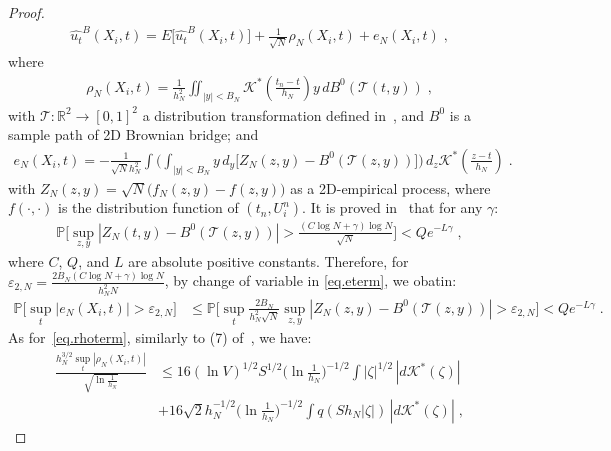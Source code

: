 \documentclass[a4paper,11pt]{article}
\theoremstyle{definition}
\begin{document}
\begin{proof}
\begin{align*}
\widehat{u_t}^B(X_i,t)=E	\Big[\widehat{u_t}^B(X_i,t)\Big]+\frac{1}{\sqrt{N}}\rho_N(X_i,t)+e_N(X_i,t)\;,
\end{align*}
where
\begin{align}
\rho_N(X_i,t)=\frac{1}{h_N^2}\iint_{|y|<B_N}	\mathcal{K}^*(\frac{t_n-t}{h_N})y\,dB^0(\mathcal{T}(t,y))\;,\label{eq.rhoterm}
\end{align}
with $\mathcal{T}:\mathbb{R}^2\to [0,1]^2$ a distribution transformation defined in~\cite{rosenblatt1952remarks}, and $B^0$ is a sample path of 2D Brownian bridge; and
\begin{align}
e_N(X_i,t)=-\frac{1}{\sqrt{N}h_N^2}\int\Big(\int_{|y|<B_N}y\,d_y\big[Z_N(z,y)-B^0(\mathcal{T}(z,y))\big]\Big)\,d_z \mathcal{K}^*(\frac{z-t}{h_N})\;.	\label{eq.eterm}
\end{align}
with $Z_N(z,y) = \sqrt{N}\big(f_N(z,y)-f(z,y)\big)$ as a 2D-empirical process, where $f(\cdot,\cdot)$ is the distribution function of $(t_n,U_i^n)$. It is proved in~\cite{tusnady1977remark} that for any $\gamma$:
\begin{align*}
\mathbb{P}\Big[\sup_{z,y}|Z_N(t,y)-B^0(\mathcal{T}(z,y))|>\frac{(C\log N+\gamma)\log N}{\sqrt{N}}\Big]<Qe^{-L \gamma}\;,
\end{align*}
where $C$, $Q$, and $L$ are absolute positive constants. Therefore, for  $\varepsilon_{2,N}=\frac{2B_N(C\log N+\gamma)\log N}{h_N^2N}$, by change of variable in \eqref{eq.eterm}, we obatin:
\begin{align*}
	\mathbb{P}\Big[\sup_{t}|e_N(X_i,t)|>\varepsilon_{2,N}\Big]&\leq\mathbb{P}\Big[\sup_{t}\frac{2B_N}{h^2_N\sqrt{N}}\sup_{z,y}|Z_N(z,y)-B^0(\mathcal{T}(z,y))|>\varepsilon_{2,N}\Big]<Qe^{-L\gamma}\;.
\end{align*}
As for~\eqref{eq.rhoterm}, similarly to (7) of~\cite{mack1982weak}, we have:
\begin{align*}
\frac{h_N^{3/2}\sup_t|\rho_N(X_i,t)|}{\sqrt{\ln\frac{1}{h_N}}}&\leq 16(\ln V)^{1/2}S^{1/2}\Big(\ln\frac{1}{h_N}\Big)^{-1/2}\int|\zeta|^{1/2}\,|d\mathcal{K}^*(\zeta)|\\
&+16\sqrt{2}h_N^{-1/2}\Big(\ln\frac{1}{h_N}\Big)^{-1/2}\int q(Sh_N|\zeta|)\,|d\mathcal{K}^*(\zeta)|\;,
\end{align*}
%
%
%

\end{proof}
\end{document}
